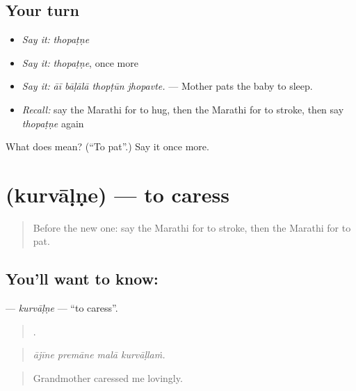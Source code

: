 \subsection*{Your turn}
\begin{itemize}
\raggedright
  \item \emph{Say it:} \emph{thopaṭṇe}
  \item \emph{Say it:} \emph{thopaṭṇe}, once more
  \item \emph{Say it:} \emph{āī bāḷālā thopṭūn jhopavte.} — Mother pats the baby to sleep.
  \item \emph{Recall:} say the Marathi for to hug, then the Marathi for to stroke, then say \emph{thopaṭṇe} again
\end{itemize}

\begin{tcolorbox}[breakable,colback=teal!4,colframe=teal!35!black,title={Before you move on}]
What does  mean? (\textquotedblleft{}To pat\textquotedblright{}.) Say it once more.
\end{tcolorbox}
\section[\texorpdfstring{\mr{कुरवाळणे} (kurvāḷṇe)}{कुरवाळणे (kurvāḷṇe)}]{ (kurvāḷṇe) — to caress}

\label{lesson:MR-C501-kurvalne}



\begin{quote}
Before the new one: say the Marathi for to stroke, then the Marathi for to pat.
\end{quote}

\subsection*{You'll want to know: }
\textbf{} — \emph{kurvāḷṇe} — \textquotedblleft{}to caress\textquotedblright{}.

\begin{quote}
   .
\end{quote}

\begin{quote}
\emph{ājīne premāne malā kurvāḷlaṁ.}
\end{quote}

\begin{quote}
Grandmother caressed me lovingly.
\end{quote}


